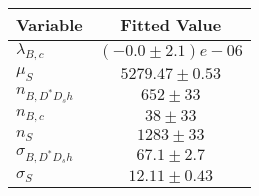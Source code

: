 \begin{tabular}[t]{lc}
\hline
Variable &Fitted Value\\
\hline\hline
$\lambda_{B,c}$&$(-0.0\pm2.1)e-06$\\
\hline
$\mu_S$&$5279.47\pm0.53$\\
\hline
$n_{B, D^* D_s h}$&$652\pm33$\\
\hline
$n_{B,c}$&$38\pm33$\\
\hline
$n_S$&$1283\pm33$\\
\hline
$\sigma_{B, D^* D_s h}$&$67.1\pm2.7$\\
\hline
$\sigma_S$&$12.11\pm0.43$\\
\hline
\end{tabular}